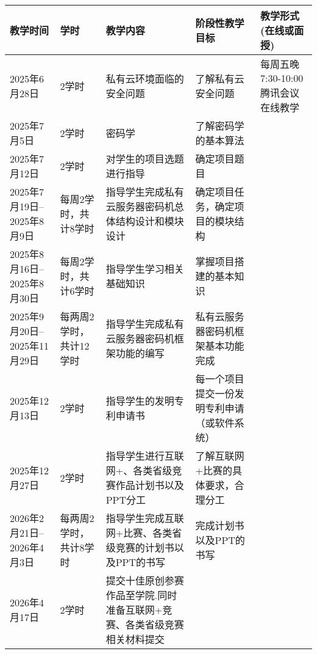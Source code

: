 \documentclass{article}
\begin{document}
\begin{table}[htbp]
\centering
\begin{tabular}{|p{2cm}|p{1.5cm}|p{3.5cm}|p{4cm}|p{3cm}|}
\hline
\textbf{教学时间} & \textbf{学时} & \textbf{教学内容} & \textbf{阶段性教学目标} & \textbf{教学形式(在线或面授)} \\
\hline
2025年6月28日 & 2学时 & 私有云环境面临的安全问题 & 了解私有云安全问题 & 每周五晚7:30-10:00腾讯会议在线教学 \\
\hline
2025年7月5日 & 2学时 & 密码学 & 了解密码学的基本算法 & \\
\hline
2025年7月12日 & 2学时 & 对学生的项目选题进行指导 & 确定项目题目 & \\
\hline
2025年7月19日--2025年8月9日 & 每周2学时，共计8学时 & 指导学生完成私有云服务器密码机总体结构设计和模块设计 & 确定项目任务，确定项目的模块结构 & \\
\hline
2025年8月16日--2025年8月30日 & 每周2学时，共计6学时 & 指导学生学习相关基础知识 & 掌握项目搭建的基本知识 & \\
\hline
2025年9月20日--2025年11月29日 & 每两周2学时，共计12学时 & 指导学生完成私有云服务器密码机框架功能的编写 & 私有云服务器密码机框架基本功能完成 & \\
\hline
2025年12月13日 & 2学时 & 指导学生的发明专利申请书 & 每一个项目提交一份发明专利申请（或软件系统） & \\
\hline
2025年12月27日 & 2学时 & 指导学生进行互联网+、各类省级竞赛作品计划书以及PPT分工 & 了解互联网+比赛的具体要求，合理分工 & \\
\hline
2026年2月21日--2026年4月3日 & 每两周2学时，共计8学时 & 指导学生完成互联网+比赛、各类省级竞赛的计划书以及PPT的书写 & 完成计划书以及PPT的书写 & \\
\hline
2026年4月17日 & 2学时 & 提交十佳原创参赛作品至学院.同时准备互联网+竞赛、各类省级竞赛相关材料提交 & & \\
\hline
\end{tabular}
\end{table}
\end{document}
